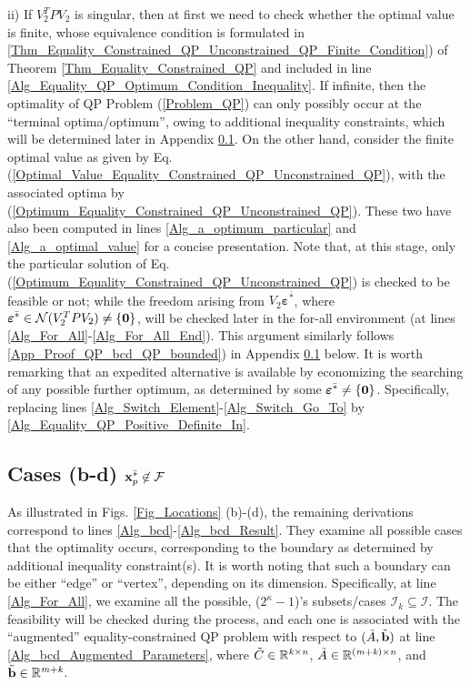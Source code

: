 \documentclass{imaman}
\newcommand{\bfb}{{\bf b}}
\newcommand{\bfx}{{\bf x}}
\newcommand{\bfvarepsilon}{{\boldsymbol \varepsilon}}
\newcommand{\bfzero}{{\bf 0}}
\newcommand{\real}{\mathbb{R}}
\newcommand{\calF}{{\mathcal F}}
\newcommand{\calI}{{\mathcal I}}
\newcommand{\calN}{{\mathcal N}}
\newcommand{\itk}{{\it k}}
\newcommand{\itm}{{\it m}}
\newcommand{\itn}{{\it n}}
\numberwithin{equation}{section}
\begin{document}
\vspace{-0.1cm}\noindent ii) If $V_2^TPV_2$ is singular, then at first we need to check whether the optimal value is finite, whose equivalence condition is formulated in \ref{Thm_Equality_Constrained_QP_Unconstrained_QP_Finite_Condition}) of Theorem \ref{Thm_Equality_Constrained_QP} and included in line \ref{Alg_Equality_QP_Optimum_Condition_Inequality}. If infinite, then the optimality of QP Problem (\ref{Problem_QP}) can only possibly occur at the ``terminal optima/optimum'', owing to additional inequality constraints, which will be determined later in Appendix \ref{App_Proof_QP_bcd}. On the other hand, consider the finite optimal value as given by Eq. (\ref{Optimal_Value_Equality_Constrained_QP_Unconstrained_QP}), with the associated optima by (\ref{Optimum_Equality_Constrained_QP_Unconstrained_QP}). These two have also been computed in lines \ref{Alg_a_optimum_particular} and \ref{Alg_a_optimal_value} for a concise presentation. Note that, at this stage, only the particular solution of Eq. (\ref{Optimum_Equality_Constrained_QP_Unconstrained_QP}) is checked to be feasible or not; while the freedom arising from $V_2\bfvarepsilon^{\bar *}$, where $\bfvarepsilon^{\bar *}\in\calN(V_2^TPV_2)\ne\{\bfzero\}$, will be checked later in the for-all environment (at lines \ref{Alg_For_All}-\ref{Alg_For_All_End}). This argument similarly follows \ref{App_Proof_QP_bcd_QP_bounded}) in Appendix \ref{App_Proof_QP_bcd} below. It is worth remarking that an expedited alternative is available by economizing the searching of any possible further optimum, as determined by some $\bfvarepsilon^{\bar *}\ne\{\bfzero\}$. Specifically, replacing lines \ref{Alg_Switch_Element}-\ref{Alg_Switch_Go_To} by \ref{Alg_Equality_QP_Positive_Definite_In}.

\vspace{-0.3cm}\subsection{Cases (b-d) $\bfx_p^{\bar *}\not\in\calF$}
\label{App_Proof_QP_bcd}\vspace{-0.1cm}
As illustrated in Figs. \ref{Fig_Locations} (b)-(d), the remaining derivations correspond to lines \ref{Alg_bcd}-\ref{Alg_bcd_Result}. They examine all possible cases that the optimality occurs, corresponding to the boundary as determined by additional inequality constraint(s). It is worth noting that such a boundary can be either ``edge'' or ``vertex'', depending on its dimension. Specifically, at line \ref{Alg_For_All}, we examine all the possible, ($2^\kappa-1$)'s subsets/cases $\calI_k\subseteq\calI$. The feasibility will be checked during the process, and each one is associated with the ``augmented'' equality-constrained QP problem with respect to $(\tilde A,\tilde\bfb)$ at line \ref{Alg_bcd_Augmented_Parameters}, where $\tilde C\in\real^{\itk\times\itn}$, $\tilde A\in\real^{(\itm+\itk)\times\itn}$, and $\tilde\bfb\in\real^{\itm+\itk}$.
\end{document}
